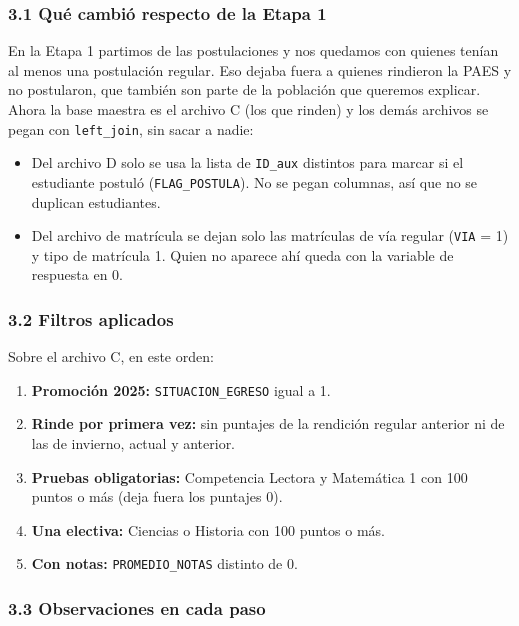 \documentclass[11pt]{article}
\begin{document}
\subsubsection*{3.1 \; Qué cambió respecto de la Etapa 1}

En la Etapa 1 partimos de las postulaciones y nos quedamos con quienes
tenían al menos una postulación regular. Eso dejaba fuera a quienes
rindieron la PAES y no postularon, que también son parte de la población
que queremos explicar. Ahora la base maestra es el archivo C (los que
rinden) y los demás archivos se pegan con \texttt{left\_join}, sin sacar
a nadie:

\begin{itemize}[leftmargin=1.5em, itemsep=0.3em]
  \item Del archivo D solo se usa la lista de \texttt{ID\_aux} distintos
        para marcar si el estudiante postuló (\texttt{FLAG\_POSTULA}). No
        se pegan columnas, así que no se duplican estudiantes.
  \item Del archivo de matrícula se dejan solo las matrículas de vía
        regular (\texttt{VIA} = 1) y tipo de matrícula 1. Quien no
        aparece ahí queda con la variable de respuesta en 0.
\end{itemize}

\subsubsection*{3.2 \; Filtros aplicados}

Sobre el archivo C, en este orden:

\begin{enumerate}[leftmargin=1.5em, itemsep=0.3em, label=\textbf{\alph*)}]
  \item \textbf{Promoción 2025:} \texttt{SITUACION\_EGRESO} igual a 1.
  \item \textbf{Rinde por primera vez:} sin puntajes de la rendición
        regular anterior ni de las de invierno, actual y anterior.
  \item \textbf{Pruebas obligatorias:} Competencia Lectora y Matemática 1
        con 100 puntos o más (deja fuera los puntajes 0).
  \item \textbf{Una electiva:} Ciencias o Historia con 100 puntos o más.
  \item \textbf{Con notas:} \texttt{PROMEDIO\_NOTAS} distinto de 0.
\end{enumerate}

\subsubsection*{3.3 \; Observaciones en cada paso}
\end{document}
